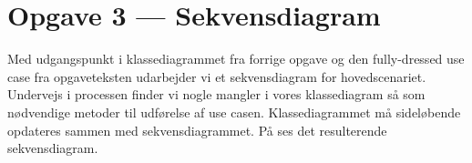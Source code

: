 \section{Opgave 3 --- Sekvensdiagram}

Med udgangspunkt i klassediagrammet fra forrige opgave og den fully-dressed use case fra opgaveteksten udarbejder vi et sekvensdiagram for hovedscenariet. Undervejs i processen finder vi nogle mangler i vores klassediagram så som nødvendige metoder til udførelse af use casen. Klassediagrammet må sideløbende opdateres sammen med sekvensdiagrammet.
På  ses det resulterende sekvensdiagram.

